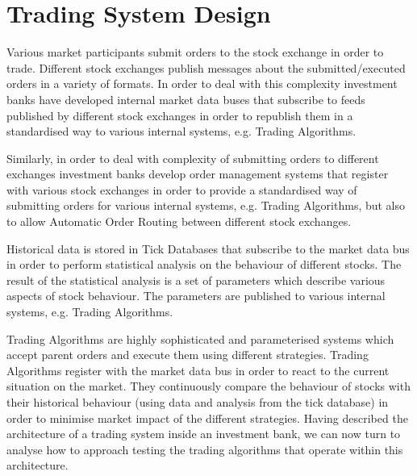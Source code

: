 \section{Trading System Design} 

Various market participants submit orders to the stock exchange in order to trade. Different stock exchanges publish messages about the submitted/executed orders in a variety of formats. In order to deal with this complexity investment banks have developed internal market data buses that subscribe to feeds published by different stock exchanges in order to republish them in a standardised way to various internal systems, e.g. Trading Algorithms.

Similarly, in order to deal with complexity of submitting orders to different exchanges investment banks develop order management systems that register with various stock exchanges in order to provide a standardised way of submitting orders for various internal systems, e.g. Trading Algorithms, but also to allow Automatic Order Routing between different stock exchanges.

Historical data is stored in Tick Databases that subscribe to the market data bus in order to perform statistical analysis on the behaviour of different stocks. The result of the statistical analysis is a set of parameters which describe various aspects of stock behaviour. The parameters are published to various internal systems, e.g. Trading Algorithms.

Trading Algorithms are highly sophisticated and parameterised systems which accept parent orders and execute them using different strategies. Trading Algorithms register with the market data bus in order to react to the current situation on the market. They continuously compare the behaviour of stocks with their historical behaviour (using data and analysis from the tick database) in order to minimise market impact of the different strategies. Having described the architecture of a trading system inside an investment bank, we can now turn to analyse how to approach testing the trading algorithms that operate within this architecture.
